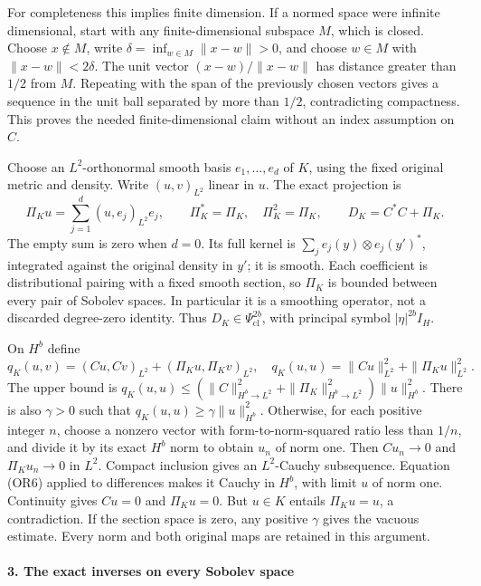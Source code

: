 \documentclass[
  11pt,
]{article}
\begin{document}
For completeness this implies finite dimension. If a normed space were
infinite dimensional, start with any finite-dimensional subspace \(M\),
which is closed. Choose \(x\notin M\), write
\(\delta=\inf_{w\in M}\|x-w\|>0\), and choose \(w\in M\) with
\(\|x-w\|<2\delta\). The unit vector \((x-w)/\|x-w\|\) has distance
greater than \(1/2\) from \(M\). Repeating with the span of the
previously chosen vectors gives a sequence in the unit ball separated by
more than \(1/2\), contradicting compactness. This proves the needed
finite-dimensional claim without an index assumption on \(C\).

Choose an \(L^2\)-orthonormal smooth basis \(e_1,\ldots,e_d\) of \(K\),
using the fixed original metric and density. Write \((u,v)_{L^2}\)
linear in \(u\). The exact projection is \[
 \Pi_Ku=\sum_{j=1}^d(u,e_j)_{L^2}e_j,
 \qquad \Pi_K^*=\Pi_K,\quad\Pi_K^2=\Pi_K,
 \qquad D_K=C^*C+\Pi_K.
 \tag{OR7}
\] The empty sum is zero when \(d=0\). Its full kernel is
\(\sum_je_j(y)\otimes e_j(y')^*\), integrated against the original
density in \(y'\); it is smooth. Each coefficient is distributional
pairing with a fixed smooth section, so \(\Pi_K\) is bounded between
every pair of Sobolev spaces. In particular it is a smoothing operator,
not a discarded degree-zero identity. Thus
\(D_K\in\Psi^{2b}_{\mathrm{cl}}\), with principal symbol
\(|\eta|^{2b}I_H\).

On \(H^b\) define \[
 q_K(u,v)=(Cu,Cv)_{L^2}+(\Pi_Ku,\Pi_Kv)_{L^2},
 \quad q_K(u,u)=\|Cu\|_{L^2}^2+\|\Pi_Ku\|_{L^2}^2.
 \tag{OR8}
\] The upper bound is
\(q_K(u,u)\leq(\|C\|_{H^b\to L^2}^2+\|\Pi_K\|_{H^b\to L^2}^2)\|u\|_{H^b}^2\).
There is also \(\gamma>0\) such that
\(q_K(u,u)\geq\gamma\|u\|_{H^b}^2\). Otherwise, for each positive
integer \(n\), choose a nonzero vector with form-to-norm-squared ratio
less than \(1/n\), and divide it by its exact \(H^b\) norm to obtain
\(u_n\) of norm one. Then \(Cu_n\to0\) and \(\Pi_Ku_n\to0\) in \(L^2\).
Compact inclusion gives an \(L^2\)-Cauchy subsequence. Equation (OR6)
applied to differences makes it Cauchy in \(H^b\), with limit \(u\) of
norm one. Continuity gives \(Cu=0\) and \(\Pi_Ku=0\). But \(u\in K\)
entails \(\Pi_Ku=u\), a contradiction. If the section space is zero, any
positive \(\gamma\) gives the vacuous estimate. Every norm and both
original maps are retained in this argument.

\paragraph{3. The exact inverses on every Sobolev
space}\label{the-exact-inverses-on-every-sobolev-space}
\end{document}
